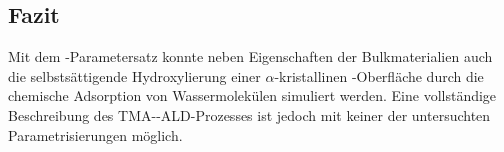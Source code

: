 \subsection{Fazit}

Mit dem -Parametersatz konnte neben Eigenschaften der Bulkmaterialien auch die selbstsättigende Hydroxylierung einer $\alpha$-kristallinen -Ober\-fläche durch die chemische Adsorption von Wassermolekülen simuliert werden.
Eine vollständige Beschreibung des TMA--ALD-Prozesses ist jedoch mit keiner der untersuchten Parametrisierungen möglich.

